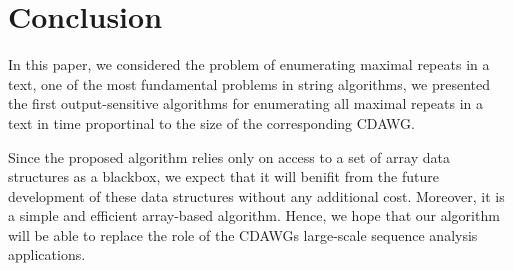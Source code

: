 \section{Conclusion}
\label{sec:conc}
In this paper, we considered the problem of enumerating maximal repeats in a text, one of the most fundamental problems in string algorithms, we presented the first output-sensitive algorithms for enumerating all maximal repeats in a text in time proportinal to the size of the corresponding CDAWG. 

Since the proposed algorithm relies only on access to a set of array data structures as a blackbox, we expect that it will benifit from the future development of these data structures without any additional cost. Moreover, it is a simple and efficient array-based algorithm. Hence, we hope that our algorithm will be able to replace the role of the CDAWGs large-scale sequence analysis applications.
